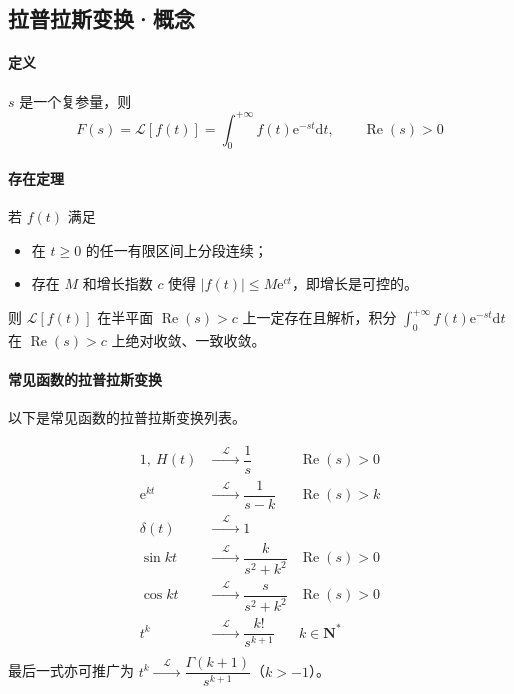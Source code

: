 \documentclass[UTF8]{ctexart}
\newcommand\e{\mathrm{e}}
\renewcommand\d{\mathrm{d}}
\renewcommand\L{\mathcal{L}}
\newcommand\lbh{\xrightarrow{\quad \mathcal{L} \quad}} %
\renewcommand\Re{\operatorname{Re}}
\begin{document}
\subsection{拉普拉斯变换·概念}
\paragraph{定义} $s$ 是一个复参量，则
\begin{equation}
    F(s) = \L[f(t)] = \int_0^{+\infty} f(t)\e^{-st}\d t ,\qquad \Re(s)>0
\end{equation}

\paragraph{存在定理}
若 $f(t)$ 满足

\begin{itemize}[itemsep=0pt]
    \item 在 $t\geqslant 0$ 的任一有限区间上分段连续；
    \item 存在 $M$ 和增长指数 $c$ 使得 $|f(t)|\leqslant M\e^{ct}$，即增长是可控的。
\end{itemize}
则 $\L[f(t)]$ 在半平面 $\Re(s)>c$ 上一定存在且解析，积分 $\displaystyle \int_0^{+\infty} f(t)\e^{-st}\d t$ 在 $\Re(s)>c$ 上绝对收敛、一致收敛。

\paragraph{常见函数的拉普拉斯变换}
以下是常见函数的拉普拉斯变换列表。

\begin{mybox}
\begin{equation*}\begin{aligned}
    1,\  H(t) &\lbh \dfrac1s & \Re(s)>0 \\
    \e^{kt} &\lbh \dfrac{1}{s-k} & \Re(s)>k \\
    \delta(t) &\lbh 1 & \\
    \sin kt &\lbh \dfrac{k}{s^2+k^2} & \Re(s)>0 \\
    \cos kt &\lbh \dfrac{s}{s^2+k^2} & \Re(s)>0 \\
    t^k & \lbh \dfrac{k!}{s^{k+1}} & k\in\mathbf{N}^* \\
\end{aligned}\end{equation*}
最后一式亦可推广为 $t^k \lbh \dfrac{\varGamma(k+1)}{s^{k+1}}$（$k>-1$）。
\end{mybox}
\end{document}
